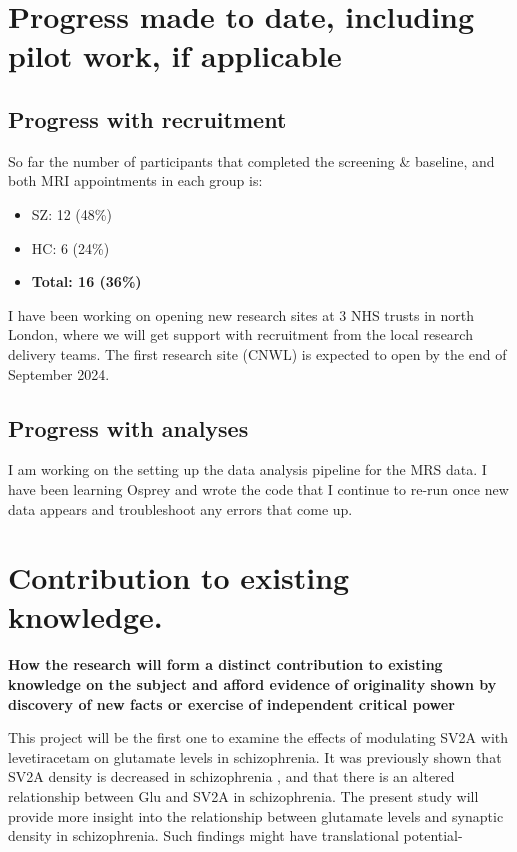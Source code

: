 \documentclass[
  letterpaper,
  DIV=11,
  numbers=noendperiod]{scrartcl}
\providecommand{\tightlist}{%
  \setlength{\itemsep}{0pt}\setlength{\parskip}{0pt}}\usepackage{longtable,booktabs,array}
\begin{document}
\section{Progress made to date, including pilot work, if
applicable}\label{progress-made-to-date-including-pilot-work-if-applicable}

\subsection{Progress with recruitment}\label{progress-with-recruitment}

So far the number of participants that completed the screening \&
baseline, and both MRI appointments in each group is:

\begin{itemize}
\tightlist
\item
  SZ: 12 (48\%)
\item
  HC: 6 (24\%)
\item
  \textbf{Total: 16 (36\%)}
\end{itemize}

I have been working on opening new research sites at 3 NHS trusts in
north London, where we will get support with recruitment from the local
research delivery teams. The first research site (CNWL) is expected to
open by the end of September 2024.

\subsection{Progress with analyses}\label{progress-with-analyses}

I am working on the setting up the data analysis pipeline for the MRS
data. I have been learning Osprey and wrote the code that I continue to
re-run once new data appears and troubleshoot any errors that come up.

\section{Contribution to existing
knowledge.}\label{contribution-to-existing-knowledge.}

\textbf{How the research will form a distinct contribution to existing
knowledge on the subject and afford evidence of originality shown by
discovery of new facts or exercise of independent critical power}

This project will be the first one to examine the effects of modulating
SV2A with levetiracetam on glutamate levels in schizophrenia. It was
previously shown that SV2A density is decreased in schizophrenia
\autocite{radhakrishnan_vivo_2021,onwordi_synaptic_2020}, and that there
is an altered relationship between Glu and SV2A in schizophrenia. The
present study will provide more insight into the relationship between
glutamate levels and synaptic density in schizophrenia. Such findings
might have translational potential-
\end{document}

